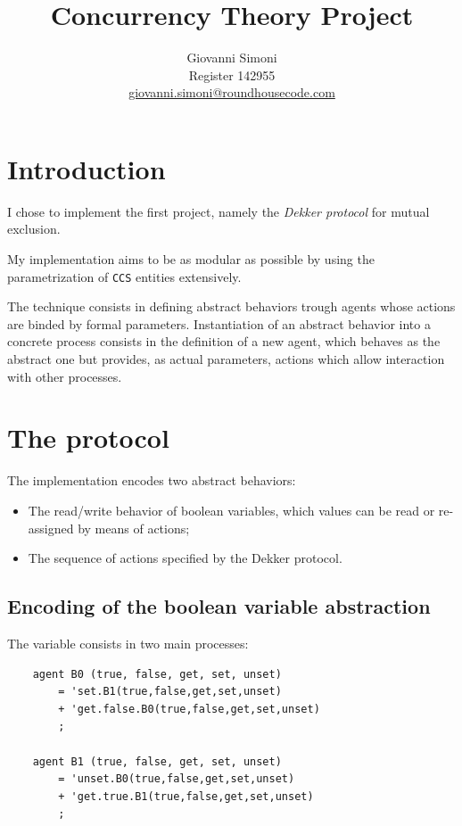 \documentclass[10pt,a4paper]{article}
\title {
    Concurrency Theory Project
}
\author{
    Giovanni Simoni\\
    Register 142955\\
    \href{mailto:giovanni.simoni@roundhousecode.com}
         {giovanni.simoni@roundhousecode.com}
}
\newcommand{\CCS}{{\tt CCS}}
\begin{document}
\maketitle

\section{Introduction}
\label{sec:Intro}

    I chose to implement the first project, namely the \emph{Dekker
    protocol} for mutual exclusion.

    My implementation aims to be as modular as possible by using the
    parametrization of \CCS{} entities extensively.

    The technique consists in defining abstract behaviors trough agents
    whose actions are binded by formal parameters. Instantiation of an
    abstract behavior into a concrete process consists in the definition
    of a new agent, which behaves as the abstract one but provides, as
    actual parameters, actions which allow interaction with other
    processes.

\section{The protocol}

    The implementation encodes two abstract behaviors:

    \begin{itemize}

    \item   The read/write behavior of boolean variables, which values can
            be read or re-assigned by means of actions;

    \item   The sequence of actions specified by the Dekker
            protocol.

    \end{itemize}

    \subsection{Encoding of the boolean variable abstraction}
    \label{sub:EncodeBool}

        The variable consists in two main processes:

        \begin{verbatim}
    agent B0 (true, false, get, set, unset)
        = 'set.B1(true,false,get,set,unset)
        + 'get.false.B0(true,false,get,set,unset)
        ;

    agent B1 (true, false, get, set, unset)
        = 'unset.B0(true,false,get,set,unset)
        + 'get.true.B1(true,false,get,set,unset)
        ;
        \end{verbatim}
\end{document}
